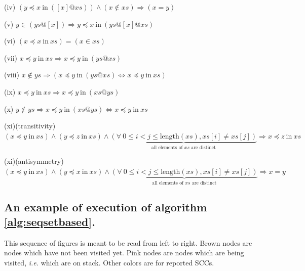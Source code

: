 \documentclass[a4 paper, 12pt]{article}
\begin{document}
{\begin{flushleft}
    (iv)
    $(y \preceq x~\text{in}~([x] @ xs)) \wedge (x \notin xs) \Longrightarrow (x = y)$
\end{flushleft}

\begin{flushleft}
    (v)
    $y \in (ys @ [x]) \Longrightarrow y \preceq x~\text{in}~(ys @ [x] @ xs)$
\end{flushleft} 

\begin{flushleft}
    (vi)
    $(x \preceq x~\text{in}~xs) = (x \in xs)$
\end{flushleft}

\begin{flushleft}
    (vii)
    $x \preceq y~\text{in}~xs \Longrightarrow x \preceq y~\text{in}~(ys @ xs)$
\end{flushleft}

\begin{flushleft}
    (viii)
    $x \notin ys \Longrightarrow (x \preceq y~\text{in}~(ys @ xs) \Longleftrightarrow x \preceq y~\text{in}~xs)$
\end{flushleft}

\begin{flushleft}
    (ix)
    $x \preceq y~\text{in}~xs \Longrightarrow x \preceq y~\text{in}~(xs @ ys)$
\end{flushleft}

\begin{flushleft}
    (x)
    $y \notin ys \Longrightarrow x \preceq y~\text{in}~(xs @ ys) \Longleftrightarrow x \preceq y~\text{in}~xs$
\end{flushleft}

\begin{flushleft}
    (xi)(transitivity)
    $(x \preceq y~\text{in}~xs) \wedge (y \preceq z~\text{in}~xs) \wedge \underset{\text{all elements of $xs$ are distinct}}{\underbrace{(\forall~0 \leq i < j \leq \text{length}(xs), xs[i] \neq xs[j])}} \Longrightarrow x \preceq z~\text{in}~xs$
\end{flushleft}

\begin{flushleft}
    (xi)(antisymmetry)
    $(x \preceq y~\text{in}~xs) \wedge (y \preceq x~\text{in}~xs) \wedge \underset{\text{all elements of $xs$ are distinct}}{\underbrace{(\forall~0 \leq i < j \leq \text{length}(xs), xs[i] \neq xs[j])}} \Longrightarrow x = y$
\end{flushleft}

\subsection{An example of execution of algorithm \ref{alg:seqsetbased}.}\label{appendix:exec_ex}
This sequence of figures is meant to be read from left to right. Brown nodes are nodes which have not been visited yet. Pink nodes are nodes which are being visited, \textit{i.e.} which are on stack. Other colors are for reported SCCs.

}
\end{document}
